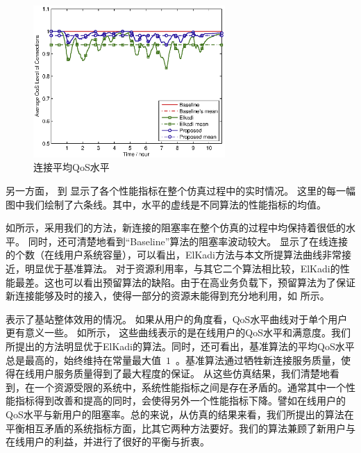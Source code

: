 % 
\begin{figure}[htbp]
\centering
\includegraphics[width=0.65\textwidth] {cacop_avg_qos.eps}
\caption{连接平均QoS水平}\label{fig:chap_cacop:clock_avg_call_qos}
\end{figure}



另一方面， 到  显示了各个性能指标在整个仿真过程中的实时情况。
这里的每一幅图中我们绘制了六条线。其中，水平的虚线是不同算法的性能指标的均值。

如所示，采用我们的方法，新连接的阻塞率在整个仿真的过程中均保持着很低的水平。
同时，还可清楚地看到“Baseline”算法的阻塞率波动较大。
 显示了在线连接的个数（在线用户系统容量），可以看出，ElKadi方法与本文所提算法曲线非常接近，明显优于基准算法。
对于资源利用率，与其它二个算法相比较，ElKadi的性能最差。这也可以看出预留算法的缺陷。由于在高业务负载下，预留算法为了保证新连接能够及时的接入，使得一部分的资源未能得到充分地利用，如 所示。
 
表示了基站整体效用的情况。
如果从用户的角度看，QoS水平曲线对于单个用户更有意义一些。
如所示，
这些曲线表示的是在线用户的QoS水平和满意度。我们所提出的方法明显优于ElKadi的算法。同时，还可看出，基准算法的平均QoS水平总是最高的，始终维持在常量最大值~$1$~。基准算法通过牺牲新连接服务质量，使得在线用户服务质量得到了最大程度的保证。
从这些仿真结果，我们清楚地看到，在一个资源受限的系统中，系统性能指标之间是存在矛盾的。通常其中一个性能指标得到改善和提高的同时，会使得另外一个性能指标下降。譬如在线用户的QoS水平与新用户的阻塞率。总的来说，从仿真的结果来看，我们所提出的算法在平衡相互矛盾的系统指标方面，比其它两种方法要好。我们的算法兼顾了新用户与在线用户的利益，并进行了很好的平衡与折衷。

